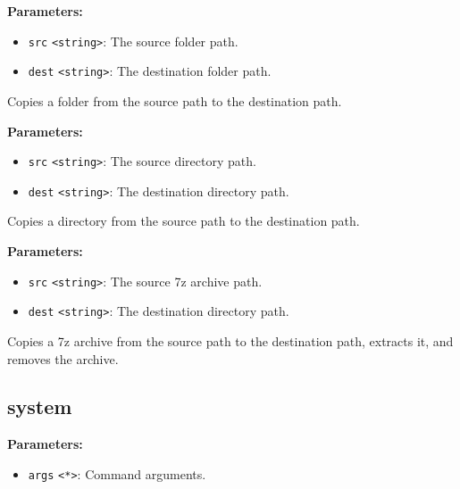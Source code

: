 \documentclass[12pt,a4paper]{article}
\begin{document}
\noindent \textbf{Parameters:}
\begin{itemize}
  \item \texttt{src} \texttt{<string>}: The source folder path.
  \item \texttt{dest} \texttt{<string>}: The destination folder path.
\end{itemize}

\noindent Copies a folder from the source path to the destination path.

\vspace{5mm}
\noindent {}


\noindent \textbf{Parameters:}
\begin{itemize}
  \item \texttt{src} \texttt{<string>}: The source directory path.
  \item \texttt{dest} \texttt{<string>}: The destination directory path.
\end{itemize}

\noindent Copies a directory from the source path to the destination path.

\vspace{5mm}
\noindent {}


\noindent \textbf{Parameters:}
\begin{itemize}
  \item \texttt{src} \texttt{<string>}: The source 7z archive path.
  \item \texttt{dest} \texttt{<string>}: The destination directory path.
\end{itemize}

\noindent Copies a 7z archive from the source path to the destination path, extracts it, and removes the archive.


\subsection{system}
\vspace{5mm}
\noindent {}


\noindent \textbf{Parameters:}
\begin{itemize}
  \item \texttt{args} \texttt{<*>}: Command arguments.
\end{itemize}
\end{document}

